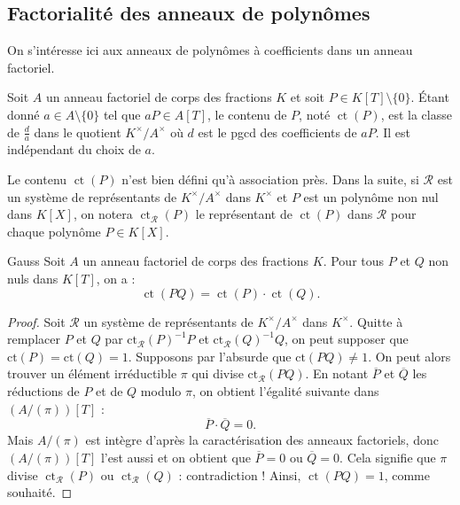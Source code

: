 \documentclass[]{report}
\begin{document}
\subsection{Factorialité des anneaux de polynômes}

On s'intéresse ici aux anneaux de polynômes à coefficients dans un anneau factoriel.

\begin{df}{}{}
    Soit $A$ un anneau factoriel de corps des fractions $K$ et soit $P \in K[T] \setminus \{0\}$. Étant donné $a \in A \setminus \{0\}$ tel que $aP \in A[T]$, le contenu de $P$, noté $\operatorname{ct}(P)$, est la classe de $\frac{d}{a}$ dans le quotient $K^{\times}/A^{\times}$ où $d$ est le pgcd des coefficients de $aP$. Il est indépendant du choix de $a$.
\end{df}

\begin{re}{}{}
    Le contenu $\operatorname{ct}(P)$ n'est bien défini qu'à association près. Dans la suite, si $\mathcal{R}$ est un système de représentants de $K^{\times}/A^{\times}$ dans $K^{\times}$ et $P$ est un polynôme non nul dans $K[X]$, on notera $\operatorname{ct}_{\mathcal{R}}(P)$ le représentant de $\operatorname{{ct}}(P)$ dans $\mathcal{R}$ pour chaque polynôme $P \in K[X]$.
\end{re}

\begin{prop}{Gauss}{}
    Soit $A$ un anneau factoriel de corps des fractions $K$. Pour tous $P$ et $Q$ non nuls dans $K[T]$, on a :
    \[\operatorname{ct}(PQ) = \operatorname{ct}(P) \cdot \operatorname{ct}(Q).\]
\end{prop}

\begin{proof}
    Soit $\mathcal{R}$ un système de représentants de $K^{\times}/A^{\times}$ dans $K^{\times}$. Quitte à remplacer $P$ et $Q$ par $\mathrm{ct}_{\mathcal{R}}(P)^{-1}P$ et $\mathrm{ct}_{\mathcal{R}}(Q)^{-1}Q$, on peut supposer que $\mathrm{ct}(P) = \mathrm{ct}(Q) = 1$. Supposons par l'absurde que $\mathrm{ct}(PQ) \neq 1$. On peut alors trouver un élément irréductible $\pi$ qui divise $\mathrm{ct}_{\mathcal{R}}(PQ)$. En notant $\overline{P}$ et $\overline{Q}$ les réductions de $P$ et de $Q$ modulo $\pi$, on obtient l'égalité suivante dans $(A/(\pi))[T]$ :
    \[\overline{P} \cdot \overline{Q} = 0.\]
    Mais $A/(\pi)$ est intègre d'après la caractérisation des anneaux factoriels, donc $(A/(\pi))[T]$ l'est aussi et on obtient que $\overline{P} = 0$ ou $\overline{Q} = 0$. Cela signifie que $\pi$ divise $\operatorname{ct}_{\mathcal{R}}(P)$ ou $\operatorname{ct}_{\mathcal{R}}(Q)$ : contradiction ! Ainsi, $\operatorname{ct}(PQ) = 1$, comme souhaité.
\end{proof}
\end{document}
